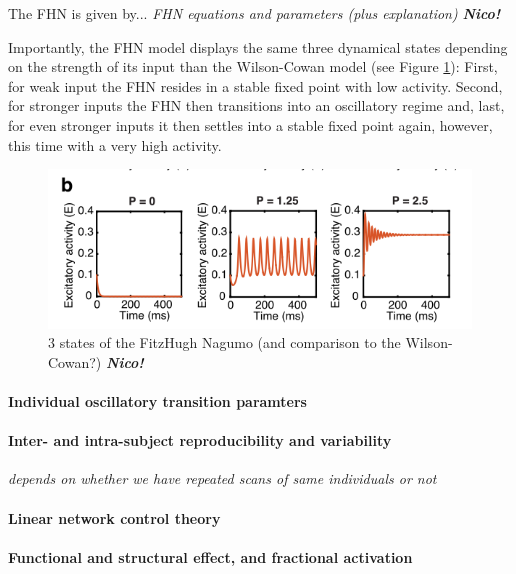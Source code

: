 The FHN is given by...\textit{  FHN equations and parameters (plus explanation)} \textbf{\textit{Nico!}}


Importantly, the FHN model displays the same three dynamical states depending on the strength of its input than the Wilson-Cowan model (see Figure \ref{fig:FHN}): 
First, for weak input the FHN resides in a stable fixed point with low activity. Second, for stronger inputs the FHN then transitions into an oscillatory
regime and, last, for even stronger inputs it then settles into a stable fixed point again, however, this time with a very high activity.

\begin{figure}
\includegraphics{Figures/placeholder}
 \caption{ 3 states of the FitzHugh Nagumo (and comparison to the Wilson-Cowan?) \textbf{\textit{Nico!}}}
 \label{fig:FHN}
\end{figure}









\paragraph{Individual oscillatory transition paramters}

\paragraph{Inter- and intra-subject reproducibility and variability}
\textit{depends on whether we have repeated scans of same individuals or not}
\paragraph{Linear network control theory}

\paragraph{Functional and structural effect, and fractional activation}


